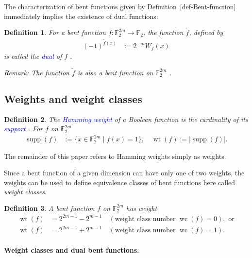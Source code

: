 \documentclass[12pt,a4paper]{article}
\newcommand{\mb}[1]{\mathbb{#1}}
\newcommand{\F}{\mb{F}}
\newcommand{\abs}[1]{\left| #1 \right|}
\newcommand{\To}{\rightarrow}
\newcommand{\Emph}[1]{\emph{\textcolor{blue}{#1}}}
\newcommand{\Cay}[1]{\operatorname{Cay}\left(#1\right)}
\newcommand{\dual}[1]{\widetilde{#1}}
\newcommand{\support}[1]{\operatorname{supp}\left(#1\right)}
\newcommand{\weight}[1]{\operatorname{wt}\left(#1\right)}
\newcommand{\weightclass}[1]{\operatorname{wc}\left(#1\right)}
\newtheorem{Definition}{Definition}
\begin{document}
The characterization of bent functions given by Definition~\ref{def-Bent-function} immediately
implies the existence of dual functions:
\begin{Definition}
\label{def-dual-Bent-function}
For a bent function $f : \F_2^{2m} \To \F_2$, the function $\dual{f}$, defined by
\begin{align*}
(-1)^{\dual{f}(x)} &:= 2^{-m} W_f(x)
\end{align*}
is called the \Emph{dual} of $f$ \cite{CarDPS10self}.

Remark: The function $\dual{f}$ is also a bent function on $\F_2^{2m}$ \cite[p. 427]{MacS77} \cite[p. 301]{Rot76}.
\end{Definition}

\subsection{Weights and weight classes}
\begin{Definition}
\label{def-weight}
The \Emph{Hamming weight} of a Boolean function is the cardinality of its \Emph{support} \cite[p. 8]{MacS77}.
For $f$ on $\F_2^{2m}$
\begin{align*}
\support{f} &:= \{x \in \F_2^{2m} \mid f(x)=1 \}, \quad \weight{f} := \abs{ \support{f} }.
\end{align*}
\end{Definition}

The remainder of this paper refers to Hamming weights simply as weights.

Since a bent function of a given dimension can have only one of two weights,
the weights can be used to define equivalence classes of bent functions %
here called \emph{weight classes}.
\begin{Definition}
\label{def-weight-class}
A bent function $f$ on $\F_2^{2m}$ has weight \cite[Theorem 6.2.10]{Dil74}
\begin{align*}
\weight{f} &= 2^{2 m - 1} - 2^{m-1} \quad (\text{weight class number~} \weightclass{f}=0),
\text{~or}
\\
\weight{f} &= 2^{2 m - 1} + 2^{m-1} \quad (\text{weight class number~} \weightclass{f}=1).
\end{align*}
\end{Definition}

\paragraph*{Weight classes and dual bent functions.}
\end{document}
